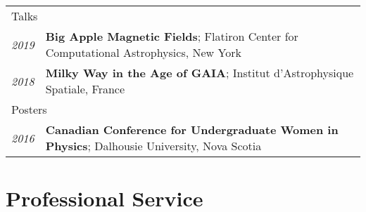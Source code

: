 \documentclass[10pt]{res} %
\begin{document}
\begin{resume}
\begin{table}[h!]
\begin{tabularx}{\textwidth}{lX}
\multicolumn{2}{l}{ \rule{0pt}{3ex} \large \hspace{-12pt} Talks \dotfill \rule[-1.2ex]{0pt}{0pt}} \\
\textit{2019} & \textbf{Big Apple Magnetic Fields}; Flatiron Center for Computational Astrophysics, New York \\
\textit{2018} & \textbf{Milky Way in the Age of GAIA}; Institut d'Astrophysique Spatiale, France \\
\multicolumn{2}{l}{ \rule{0pt}{3ex} \large \hspace{-12pt} Posters \dotfill \rule[-1.2ex]{0pt}{0pt}}  \\
\textit{2016} & \textbf{Canadian Conference for Undergraduate Women in Physics}; Dalhousie University, Nova Scotia
\end{tabularx}
\end{table}


\section{\Large Professional Service}
\vspace{-5pt} %
\noindent\makebox[\linewidth]{\rule{\textwidth}{0.4pt}}
\vspace{-20pt} %


\end{resume}
\end{document}
